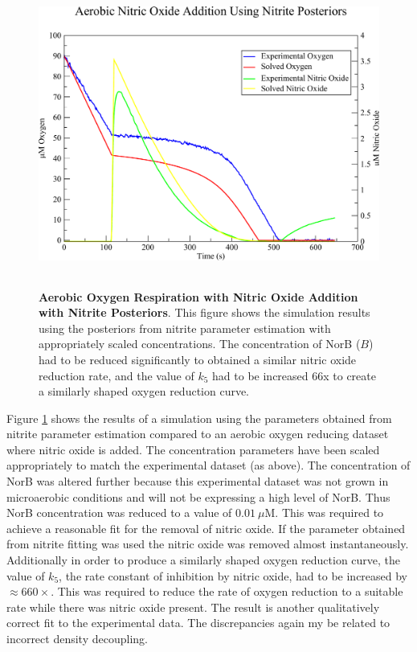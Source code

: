 \begin{figure}[tbp]
 \centering
 \includegraphics[height=10cm]{./07-nitritereduction/data/no_dataset.pdf}
 \caption[Aerobic Oxygen Respiration with Nitric Oxide Addition with Nitrite Posteriors]{{\bf Aerobic Oxygen Respiration with Nitric Oxide Addition with Nitrite Posteriors}. This figure shows the simulation results using the posteriors from nitrite parameter estimation with appropriately scaled concentrations. The concentration of NorB ($B$) had to be reduced significantly to obtained a similar nitric oxide reduction rate, and the value of $k_5$ had to be increased 66x to create a similarly shaped oxygen reduction curve.
 \label{fig:nitric_oxide_simulation}}
\end{figure}

Figure \ref{fig:nitric_oxide_simulation} shows the results of a simulation using the parameters obtained from nitrite parameter estimation compared to an aerobic oxygen reducing dataset where nitric oxide is added. The concentration parameters have been scaled appropriately to match the experimental dataset (as above). The concentration of NorB was altered further because this experimental dataset was not grown in microaerobic conditions and will not be expressing a high level of NorB. Thus NorB concentration was reduced to a value of $0.01~\mu \mathrm{M}$. This was required to achieve a reasonable fit for the removal of nitric oxide. If the parameter obtained from nitrite fitting was used the nitric oxide was removed almost instantaneously. Additionally in order to produce a similarly shaped oxygen reduction curve, the value of $k_5$, the rate constant of \cbbthree{} inhibition by nitric oxide, had to be increased by $\approx 660\times$. This was required to reduce the rate of oxygen reduction to a suitable rate 
while there was nitric oxide present. The result is another qualitatively correct fit to the experimental data. The discrepancies again my be related to incorrect density decoupling.

